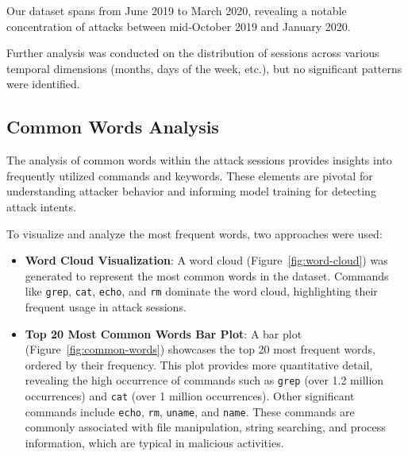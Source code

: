         
        Our dataset spans from June 2019 to March 2020, revealing a notable concentration of attacks between mid-October 2019 and January 2020.

        Further analysis was conducted on the distribution of sessions across various temporal dimensions (months, days of the week, etc.), but no significant patterns were identified.
        

    \subsection{Common Words Analysis}
    
        The analysis of common words within the attack sessions provides insights into frequently utilized commands and keywords. These elements are pivotal for understanding attacker behavior and informing model training for detecting attack intents. 

        To visualize and analyze the most frequent words, two approaches were used: 
        
        \vspace{0.2em}

        \begin{itemize}
        
            \item \textbf{Word Cloud Visualization}: A word cloud (Figure~\ref{fig:word-cloud}) was generated to represent the most common words in the dataset. Commands like \texttt{grep}, \texttt{cat}, \texttt{echo}, and \texttt{rm} dominate the word cloud, highlighting their frequent usage in attack sessions.
            
            \vspace{0.2em}

            \item \textbf{Top 20 Most Common Words Bar Plot}: A bar plot (Figure~\ref{fig:common-words}) showcases the top 20 most frequent words, ordered by their frequency. This plot provides more quantitative detail, revealing the high occurrence of commands such as \texttt{grep} (over 1.2 million occurrences) and \texttt{cat} (over 1 million occurrences). Other significant commands include \texttt{echo}, \texttt{rm}, \texttt{uname}, and \texttt{name}. These commands are commonly associated with file manipulation, string searching, and process information, which are typical in malicious activities.
            
        \end{itemize}
        
